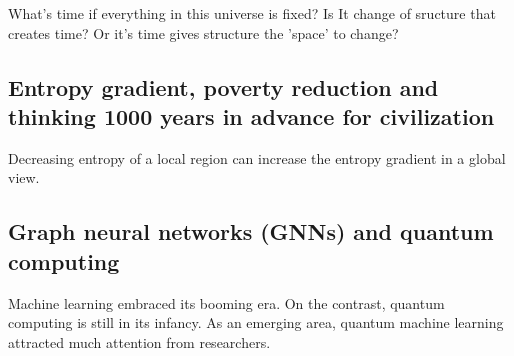 \documentclass{article}
\begin{document}
  What's time if everything in this universe is fixed? Is It change of sructure that creates time? Or it's time gives structure the 'space' to change?
  
  
  
  
  \subsection{Entropy gradient, poverty reduction and thinking 1000 years in advance for civilization}
  
  Decreasing entropy of a local region can increase the entropy gradient in a global view. 
  
  
  
  \subsection{Graph neural networks (GNNs) and quantum computing}  
  Machine learning embraced its booming era. On the contrast, quantum computing is still in its infancy. As an emerging area, quantum machine learning attracted much attention from researchers.
\end{document}
